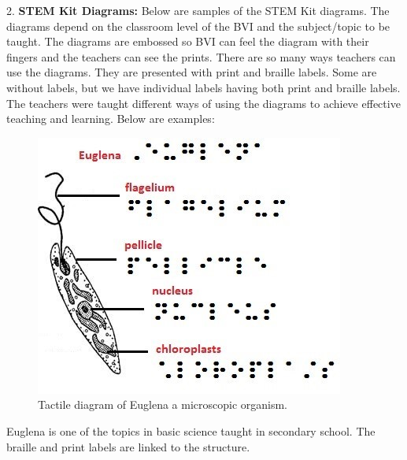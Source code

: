 \documentclass[11.5pt]{sig-alternate} %
\begin{document}
\begin{large}
2. \textbf{STEM Kit\textcopyright{} Diagrams: }Below are samples of the STEM Kit\textcopyright{} diagrams. The diagrams depend on the classroom level of the BVI and the subject/topic to be taught. The diagrams are embossed so BVI can feel the diagram with their fingers and the teachers can see the prints. There are so many ways teachers can use the diagrams. They are presented with print and braille labels. Some are without labels, but we have individual labels having both print and braille labels. The teachers were taught different ways of using the diagrams to achieve effective teaching and learning. Below are examples:  

\begin{figure}[h]
    \centering
    \includegraphics[width=1\linewidth]{images/fig2.jpg}
    \caption{Tactile diagram of Euglena a microscopic organism.}
\end{figure}

Euglena is one of the topics in basic science taught in secondary school. The braille and print labels are linked to the structure.


\end{large}
\end{document}
